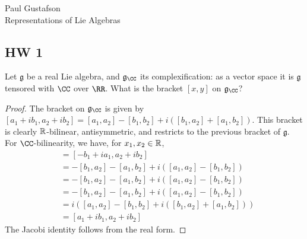 \documentclass{article}
\begin{document}
\noindent Paul Gustafson\\
\noindent Representations of Lie Algebras

\newcommand{\mf}{\mathfrak}

\subsection*{HW 1}
 Let $\mf g$ be a real Lie algebra, and $\mf g_\CC$ its complexification: as a vector space it is $\mf g$ tensored with $\CC$ over $\RR$.  What is the bracket $[x,y]$ on $\mf g_\CC$?  
\begin{proof}
The bracket on $\mf g_\CC$ is given by $[a_1 + i b_1, a_2 + i b_2] = [a_1, a_2] - [b_1, b_2] + i([b_1,a_2] + [a_1, b_2])$.  This bracket is clearly $\mathbb{R}$-bilinear, antisymmetric, and restricts to the previous bracket of $\mf g$.  For $\CC$-bilinearity, we have, for $x_1,x_2 \in \mathbb{R}$,
\begin{align*}
[i (a_1 + i b_1), a_2 + i b_2] & = [- b_1 + ia_1, a_2 + i b_2] \\
& = -[b_1, a_2] - [a_1, b_2] + i( [a_1,a_2] - [b_1, b_2]) \\
& = -[b_1, a_2] - [a_1, b_2] + i( [a_1,a_2] - [b_1, b_2]) \\
& = -[b_1, a_2] - [a_1, b_2] + i( [a_1,a_2] - [b_1, b_2]) \\
& = i ([a_1, a_2] - [b_1, b_2] + i([b_1,a_2] + [a_1, b_2])) \\
& = [a_1 + i b_1, a_2 + i b_2]
\end{align*}
The Jacobi identity follows from the real form.
\end{proof}
\end{document}
